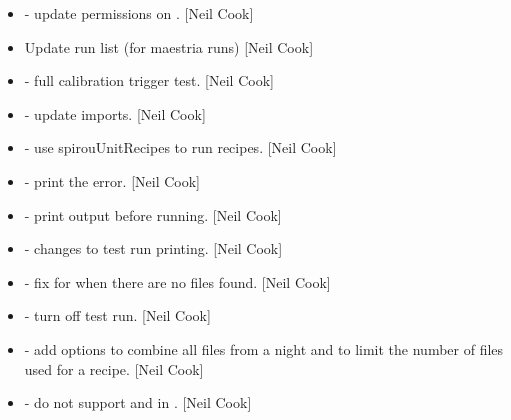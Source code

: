 \documentclass[a4paper,10pt,english]{report}
\begin{document}
\begin{itemize}
\item {} 
 - update permissions on . {[}Neil Cook{]}

\item {} 
Update run list (for maestria runs) {[}Neil Cook{]}

\item {} 
 - full calibration trigger test. {[}Neil Cook{]}

\item {} 
 - update imports. {[}Neil Cook{]}

\item {} 
 - use spirouUnitRecipes to run recipes. {[}Neil Cook{]}

\item {} 
 - print the error. {[}Neil Cook{]}

\item {} 
 - print output before running. {[}Neil Cook{]}

\item {} 
 - changes to test run printing. {[}Neil Cook{]}

\item {} 
 - fix for when there are no files found. {[}Neil
Cook{]}

\item {} 
 - turn off test run. {[}Neil Cook{]}

\item {} 
 - add options to combine all files from a night and
to limit the number of files used for a recipe. {[}Neil Cook{]}

\item {} 
 - do not support  and  in .
{[}Neil Cook{]}

\end{itemize}
\end{document}
